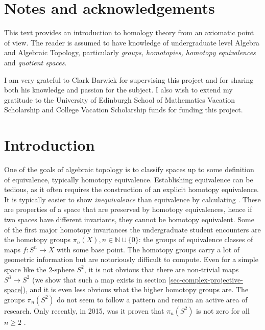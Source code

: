\section{Notes and acknowledgements}
This text provides an introduction to homology theory from an axiomatic point of view. The reader is assumed to have knowledge of undergraduate level Algebra and Algebraic Topology, particularly \textit{groups, homotopies, homotopy equivalences} and \textit{quotient spaces}.

I am very grateful to Clark Barwick for supervising this project and for sharing both his knowledge and passion for the subject. I also wish to extend my gratitude to the University of Edinburgh School of Mathematics Vacation Scholarship and College Vacation Scholarship funds for funding this project.
\section{Introduction}
One of the goals of algebraic topology is to classify spaces up to some definition of equivalence, typically homotopy equivalence. Establishing equivalence can be tedious, as it often requires the construction of an explicit homotopy equivalence. It is typically easier to show \textit{inequivalence} than equivalence by calculating . These are properties of a space that are preserved by homotopy equivalences, hence if two spaces have different invariants, they cannot be homotopy equivalent. Some of the first major homotopy invariances the undergraduate student encounters are the homotopy groups $\pi_n(X),n\in \mathbb{N}\cup \{0\}$: the groups of equivalence classes of maps $f:S^{n}\rightarrow X$ with some base point. The homotopy groups carry a lot of geometric information but are notoriously difficult to compute. Even for a simple space like the $2$-sphere $S^2$, it is not obvious that there are non-trivial maps $S^3\rightarrow S^2$ (we show that such a map exists in section \ref{sec-complex-projective-space}), and it is even less obvious what the higher homotopy groups are. The groups $\pi_n(S^2)$ do not seem to follow a pattern and remain an active area of research. Only recently, in 2015, was it proven that $\pi_n(S^2)$ is not zero for all $n\geq 2$ \cite{Ivanov}.

